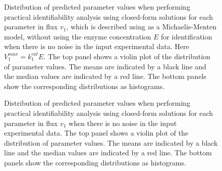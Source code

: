 \documentclass[10pt]{article}
\begin{document}
\begin{figure}[!tbhp]
	\caption{Distribution of predicted parameter values when performing practical identifiability analysis using closed-form solutions for each parameter in flux $v_1$, which is described using as a Michaelis-Menten model, without using the enzyme concentration $E$ for identification when there is no noise in the input experimental data. Here $V_1^{max} = k_1^{cat}E$. The top panel shows a violin plot of the distribution of parameter values. The means are indicated by a black line and the median values are indicated by a red line. The bottom panels show the corresponding distributions as histograms.}\label{fig:v1_v1max_ck_values}
\end{figure}

\begin{figure}[!tbhp]
	\caption{Distribution of predicted parameter values when performing practical identifiability analysis using closed-form solutions for each parameter in flux $v_1$ when there is no noise in the input experimental data. The top panel shows a violin plot of the distribution of parameter values. The means are indicated by a black line and the median values are indicated by a red line. The bottom panels show the corresponding distributions as histograms.}\label{fig:v1_kcat_ck_values}
\end{figure}
\end{document}
